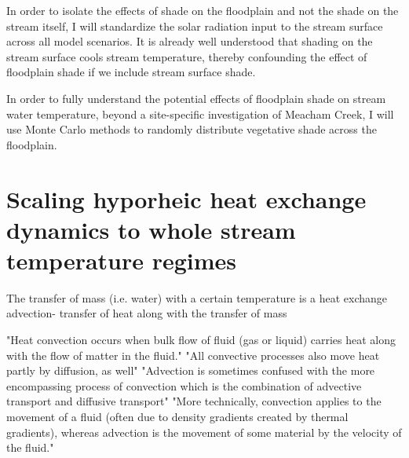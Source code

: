 \documentclass[a4paper]{article}
\begin{document}
In order to isolate the effects of shade on the floodplain and not the shade on the stream itself, I will standardize the solar radiation input to the stream surface across all model scenarios. It is already well understood that shading on the stream surface cools stream temperature, thereby confounding the effect of floodplain shade if we include stream surface shade. 

In order to fully  understand the potential effects of floodplain shade on stream water temperature, beyond a site-specific investigation of Meacham Creek, I will use Monte Carlo methods to randomly distribute vegetative shade across the floodplain.





\section{Scaling hyporheic heat exchange dynamics to whole stream temperature regimes} 

The transfer of mass (i.e. water) with a certain temperature is a heat exchange
advection- transfer of heat along with the transfer of mass

"Heat convection occurs when bulk flow of fluid (gas or liquid) carries heat along with the flow of matter in the fluid."
"All convective processes also move heat partly by diffusion, as well"
"Advection is sometimes confused with the more encompassing process of convection which is the combination of advective transport and diffusive transport"
"More technically, convection applies to the movement of a fluid (often due to density gradients created by thermal gradients), whereas advection is the movement of some material by the velocity of the fluid."
\end{document}
